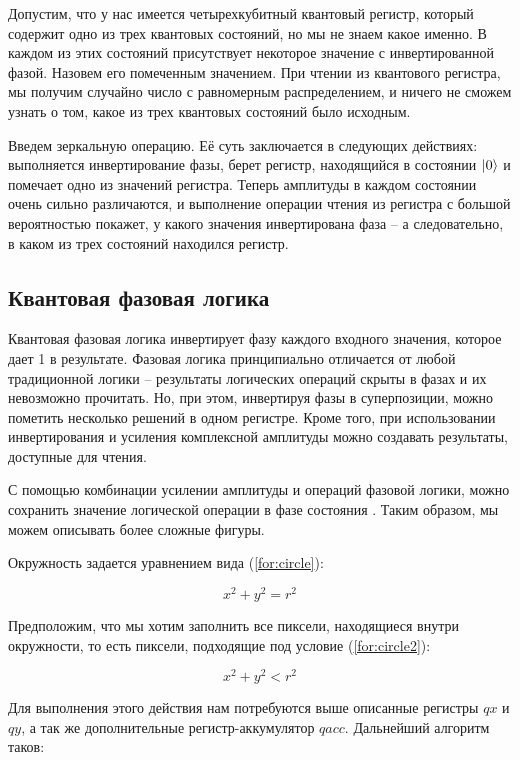Допустим, что у нас имеется четырехкубитный квантовый регистр, который содержит одно из трех квантовых состояний, но мы не знаем какое именно. В каждом из этих состояний присутствует некоторое значение с инвертированной фазой. Назовем его помеченным значением. При чтении из квантового регистра, мы получим случайно число с равномерным распределением, и ничего не сможем узнать о том, какое из трех квантовых состояний было исходным.

Введем зеркальную операцию. Её суть заключается в следующих действиях: выполняется инвертирование фазы, берет регистр, находящийся в состоянии $\lvert0\rangle$ и помечает одно из значений регистра. Теперь амплитуды в каждом состоянии очень сильно различаются, и выполнение операции чтения из регистра с большой вероятностью покажет, у какого значения инвертирована фаза -- а следовательно, в каком из трех состояний находился регистр.

\subsection{Квантовая фазовая логика}

Квантовая фазовая логика инвертирует фазу каждого входного значения, которое дает 1 в результате.
Фазовая логика принципиально отличается от любой традиционной логики -- результаты логических операций скрыты в фазах и их невозможно прочитать. Но, при этом, инвертируя фазы в суперпозиции, можно пометить несколько решений в одном регистре. Кроме того, при использовании инвертирования и усиления комплексной амплитуды можно создавать результаты, доступные для чтения.

С помощью комбинации усилении амплитуды и операций фазовой логики, можно сохранить значение логической операции в фазе состояния \cite{PQC}. Таким образом, мы можем описывать более сложные фигуры. 

Окружность задается уравнением вида (\ref{for:circle}):

\begin{equation}
\label{for:circle}
x^2 + y^2 = r^2
\end{equation}

Предположим, что мы хотим заполнить все пиксели, находящиеся внутри окружности, то есть пиксели, подходящие под условие (\ref{for:circle2}):

\begin{equation}
\label{for:circle2}
x^2 + y^2 < r^2
\end{equation}

Для выполнения этого действия нам потребуются выше описанные регистры $qx$ и $qy$, а так же дополнительные регистр-аккумулятор $qacc$. Дальнейший алгоритм таков:


